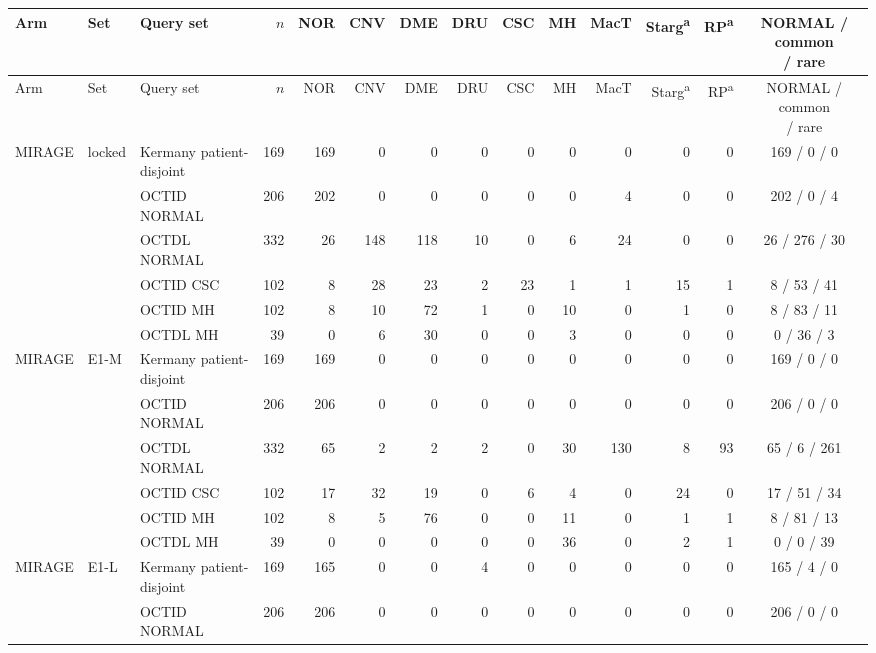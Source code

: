 \begin{longtable}{@{}lll rrrrrrrrrrc@{}}
\toprule
Arm & Set & Query set & $n$ & NOR & CNV & DME & DRU & CSC & MH & MacT & Starg\textsuperscript{a} & RP\textsuperscript{a} & \makecell{NORMAL / common\\/ rare} \\
\midrule
\endfirsthead
\toprule
Arm & Set & Query set & $n$ & NOR & CNV & DME & DRU & CSC & MH & MacT & Starg\textsuperscript{a} & RP\textsuperscript{a} & \makecell{NORMAL / common\\/ rare} \\
\midrule
\endhead
\bottomrule
\endfoot
\bottomrule
\endlastfoot
MIRAGE & locked & Kermany patient-disjoint & 169 & 169 & 0 & 0 & 0 & 0 & 0 & 0 & 0 & 0 & 169 / 0 / 0 \\
 &  & OCTID NORMAL & 206 & 202 & 0 & 0 & 0 & 0 & 0 & 4 & 0 & 0 & 202 / 0 / 4 \\
 &  & OCTDL NORMAL & 332 & 26 & 148 & 118 & 10 & 0 & 6 & 24 & 0 & 0 & 26 / 276 / 30 \\
 &  & OCTID CSC & 102 & 8 & 28 & 23 & 2 & 23 & 1 & 1 & 15 & 1 & 8 / 53 / 41 \\
 &  & OCTID MH & 102 & 8 & 10 & 72 & 1 & 0 & 10 & 0 & 1 & 0 & 8 / 83 / 11 \\
 &  & OCTDL MH & 39 & 0 & 6 & 30 & 0 & 0 & 3 & 0 & 0 & 0 & 0 / 36 / 3 \\
\addlinespace[1pt]
MIRAGE & E1-M & Kermany patient-disjoint & 169 & 169 & 0 & 0 & 0 & 0 & 0 & 0 & 0 & 0 & 169 / 0 / 0 \\
 &  & OCTID NORMAL & 206 & 206 & 0 & 0 & 0 & 0 & 0 & 0 & 0 & 0 & 206 / 0 / 0 \\
 &  & OCTDL NORMAL & 332 & 65 & 2 & 2 & 2 & 0 & 30 & 130 & 8 & 93 & 65 / 6 / 261 \\
 &  & OCTID CSC & 102 & 17 & 32 & 19 & 0 & 6 & 4 & 0 & 24 & 0 & 17 / 51 / 34 \\
 &  & OCTID MH & 102 & 8 & 5 & 76 & 0 & 0 & 11 & 0 & 1 & 1 & 8 / 81 / 13 \\
 &  & OCTDL MH & 39 & 0 & 0 & 0 & 0 & 0 & 36 & 0 & 2 & 1 & 0 / 0 / 39 \\
\addlinespace[1pt]
MIRAGE & E1-L & Kermany patient-disjoint & 169 & 165 & 0 & 0 & 4 & 0 & 0 & 0 & 0 & 0 & 165 / 4 / 0 \\
 &  & OCTID NORMAL & 206 & 206 & 0 & 0 & 0 & 0 & 0 & 0 & 0 & 0 & 206 / 0 / 0 \\

\end{longtable}
